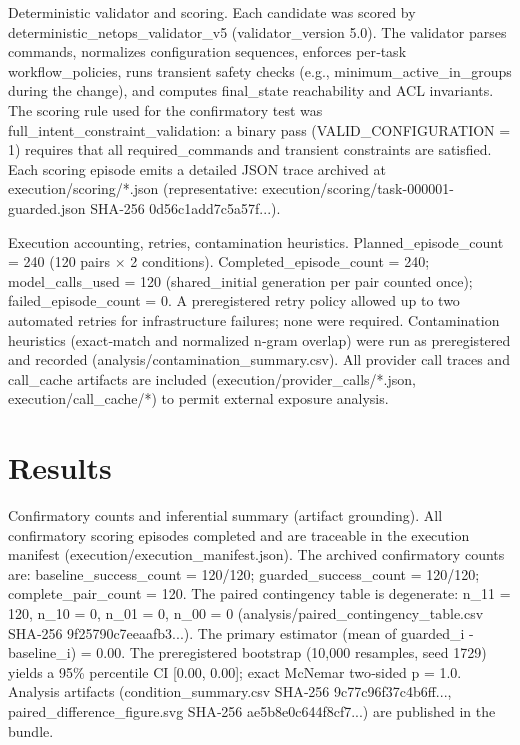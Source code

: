 \documentclass[conference]{IEEEtran}
\begin{document}
Deterministic validator and scoring. Each candidate was scored by deterministic\_netops\_validator\_v5 (validator\_version 5.0). The validator parses commands, normalizes configuration sequences, enforces per‑task workflow\_policies, runs transient safety checks (e.g., minimum\_active\_in\_groups during the change), and computes final\_state reachability and ACL invariants. The scoring rule used for the confirmatory test was full\_intent\_constraint\_validation: a binary pass (VALID\_CONFIGURATION = 1) requires that all required\_commands and transient constraints are satisfied. Each scoring episode emits a detailed JSON trace archived at execution/scoring/*.json (representative: execution/scoring/task-000001-guarded.json SHA‑256 0d56c1add7c5a57f...).

Execution accounting, retries, contamination heuristics. Planned\_episode\_count = 240 (120 pairs \ensuremath{\times} 2 conditions). Completed\_episode\_count = 240; model\_calls\_used = 120 (shared\_initial generation per pair counted once); failed\_episode\_count = 0. A preregistered retry policy allowed up to two automated retries for infrastructure failures; none were required. Contamination heuristics (exact‑match and normalized n‑gram overlap) were run as preregistered and recorded (analysis/contamination\_summary.csv). All provider call traces and call\_cache artifacts are included (execution/provider\_calls/*.json, execution/call\_cache/*) to permit external exposure analysis.

\section{Results}
Confirmatory counts and inferential summary (artifact grounding). All confirmatory scoring episodes completed and are traceable in the execution manifest (execution/execution\_manifest.json). The archived confirmatory counts are: baseline\_success\_count = 120/120; guarded\_success\_count = 120/120; complete\_pair\_count = 120. The paired contingency table is degenerate: n\_11 = 120, n\_10 = 0, n\_01 = 0, n\_00 = 0 (analysis/paired\_contingency\_table.csv SHA‑256 9f25790c7eeaafb3...). The primary estimator (mean of guarded\_i - baseline\_i) = 0.00. The preregistered bootstrap (10,000 resamples, seed 1729) yields a 95\% percentile CI [0.00, 0.00]; exact McNemar two‑sided p = 1.0. Analysis artifacts (condition\_summary.csv SHA‑256 9c77c96f37c4b6ff..., paired\_difference\_figure.svg SHA‑256 ae5b8e0c644f8cf7...) are published in the bundle.
\end{document}
